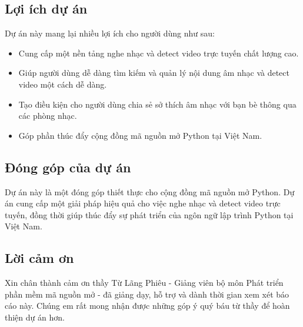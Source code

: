 \documentclass[a4paper]{article}
\begin{document}
	\subsection{Lợi ích dự án}
	\indent Dự án này mang lại nhiều lợi ích cho người dùng như sau:
\begin{itemize}
	\item Cung cấp một nền tảng nghe nhạc và detect video trực tuyến chất lượng cao.
    \item Giúp người dùng dễ dàng tìm kiếm và quản lý nội dung âm nhạc và detect video một cách dễ dàng.
    \item Tạo điều kiện cho người dùng chia sẻ sở thích âm nhạc với bạn bè thông qua các phòng nhạc.
    \item Góp phần thúc đẩy cộng đồng mã nguồn mở Python tại Việt Nam.
\end{itemize}
\subsection{Đóng góp của dự án}
\indent Dự án này là một đóng góp thiết thực cho cộng đồng mã nguồn mở Python. Dự án cung cấp một giải pháp hiệu quả cho việc nghe nhạc và detect video trực tuyến, đồng thời giúp thúc đẩy sự phát triển của ngôn ngữ lập trình Python tại Việt Nam.


\subsection{Lời cảm ơn}
\indent Xin chân thành cảm ơn thầy Từ Lãng Phiêu - Giảng viên bộ môn Phát triển phần mềm mã nguồn mở -  đã giảng dạy, hỗ trợ và dành thời gian xem xét báo cáo này. Chúng em rất mong nhận được những góp ý quý báu từ thầy để hoàn thiện dự án hơn.
\end{document}
